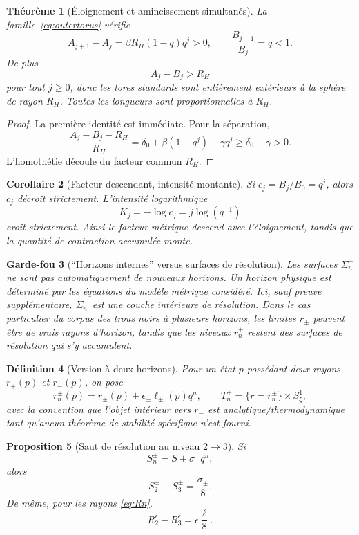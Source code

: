 \documentclass[11pt,a4paper]{article}
\newtheorem{theorem}{Théorème}[section]
\newtheorem{proposition}[theorem]{Proposition}
\newtheorem{corollary}[theorem]{Corollaire}
\newtheorem{definition}[theorem]{Définition}
\newtheorem{guardrail}[theorem]{Garde-fou}
\begin{document}
\begin{theorem}[Éloignement et amincissement simultanés]\label{thm:outercontract}
La famille~\eqref{eq:outertorus} vérifie
\[
 A_{j+1}-A_j=\beta R_H(1-q)q^j>0,
 \qquad
 \frac{B_{j+1}}{B_j}=q<1.
\]
De plus
\[
 A_j-B_j>R_H
\]
pour tout $j\ge0$, donc les tores standards sont entièrement extérieurs à la sphère de rayon $R_H$. Toutes les longueurs sont proportionnelles à $R_H$.
\end{theorem}

\begin{proof}
La première identité est immédiate. Pour la séparation,
\[
 \frac{A_j-B_j-R_H}{R_H}
 =\delta_0+\beta(1-q^j)-\gamma q^j
 \ge \delta_0-\gamma>0.
\]
L'homothétie découle du facteur commun $R_H$.
\end{proof}

\begin{corollary}[Facteur descendant, intensité montante]
Si $c_j=B_j/B_0=q^j$, alors $c_j$ décroît strictement. L'intensité logarithmique
\[
 K_j=-\log c_j=j\log(q^{-1})
\]
croît strictement. Ainsi le \emph{facteur métrique} descend avec l'éloignement, tandis que la \emph{quantité de contraction accumulée} monte.
\end{corollary}

\begin{guardrail}[``Horizons internes'' versus surfaces de résolution]
Les surfaces $\Sigma_n^-$ ne sont pas automatiquement de nouveaux horizons. Un horizon physique est déterminé par les équations du modèle métrique considéré. Ici, sauf preuve supplémentaire, $\Sigma_n^-$ est une couche intérieure de résolution. Dans le cas particulier du corpus des trous noirs à plusieurs horizons, les limites $r_\pm$ peuvent être de vrais rayons d'horizon, tandis que les niveaux $r_n^\pm$ restent des surfaces de résolution qui s'y accumulent.
\end{guardrail}

\begin{definition}[Version à deux horizons]
Pour un état $p$ possédant deux rayons $r_+(p)$ et $r_-(p)$, on pose
\[
 r_n^\pm(p)=r_\pm(p)+\epsilon_\pm\ell_\pm(p)q^n,
\qquad
 T_n^\pm=\{r=r_n^\pm\}\times S^1_\xi,
\]
avec la convention que l'objet intérieur vers $r_-$ est analytique/thermodynamique tant qu'aucun théorème de stabilité spécifique n'est fourni.
\end{definition}

\begin{proposition}[Saut de résolution au niveau $2\to3$]
Si
\[
 S_n^\pm=S+\sigma_\pm q^n,
\]
alors
\[
 S_2^\pm-S_3^\pm=\frac{\sigma_\pm}{8}.
\]
De même, pour les rayons \eqref{eq:Rn},
\[
 R_2^\epsilon-R_3^\epsilon=\epsilon\frac{\ell}{8}.
\]
\end{proposition}
\end{document}
